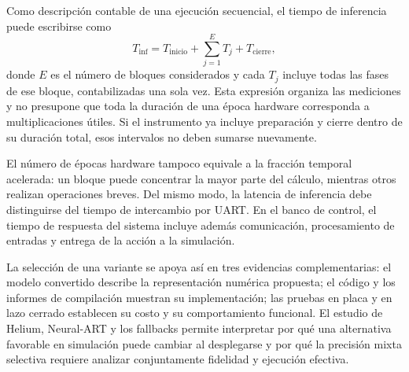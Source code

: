 Como descripción contable de una ejecución secuencial, el tiempo de inferencia puede escribirse como
\begin{equation}
T_{\mathrm{inf}}=T_{\mathrm{inicio}}+\sum_{j=1}^{E}T_j+T_{\mathrm{cierre}},
\label{eq:cap4_tiempo}
\end{equation}
donde $E$ es el número de bloques considerados y cada $T_j$ incluye todas las fases de ese bloque, contabilizadas una sola vez. Esta expresión organiza las mediciones y no presupone que toda la duración de una época hardware corresponda a multiplicaciones útiles. Si el instrumento ya incluye preparación y cierre dentro de su duración total, esos intervalos no deben sumarse nuevamente.

El número de épocas hardware tampoco equivale a la fracción temporal acelerada: un bloque puede concentrar la mayor parte del cálculo, mientras otros realizan operaciones breves. Del mismo modo, la latencia de inferencia debe distinguirse del tiempo de intercambio por UART. En el banco de control, el tiempo de respuesta del sistema incluye además comunicación, procesamiento de entradas y entrega de la acción a la simulación.

La selección de una variante se apoya así en tres evidencias complementarias: el modelo convertido describe la representación numérica propuesta; el código y los informes de compilación muestran su implementación; las pruebas en placa y en lazo cerrado establecen su costo y su comportamiento funcional. El estudio de Helium, Neural-ART y los fallbacks permite interpretar por qué una alternativa favorable en simulación puede cambiar al desplegarse y por qué la precisión mixta selectiva requiere analizar conjuntamente fidelidad y ejecución efectiva.
